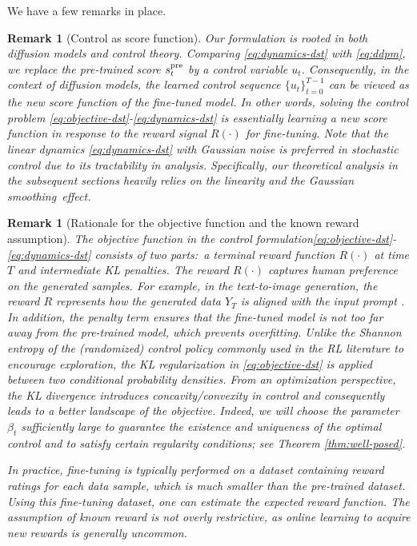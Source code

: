 \documentclass{article}
\newtheorem{Remark}[Theorem]{Remark}
\begin{document}
{We have a few remarks in place.}    
\begin{Remark}[Control as score function]
    Our formulation is rooted in both diffusion models and control theory. Comparing \eqref{eq:dynamics-dst} with \eqref{eq:ddpm}, we replace the pre-trained score $s_t^{\rm pre}$ by a control variable $u_t$. Consequently, in the context of diffusion models, the learned control sequence $\{u_t\}_{t=0}^{T-1}$ can be viewed as the {\it new} score function of the fine-tuned model. In other words, solving the control problem \eqref{eq:objective-dst}-\eqref{eq:dynamics-dst} is essentially learning a new score function in response to the reward signal $R(\cdot)$ for fine-tuning. Note that the linear dynamics \eqref{eq:dynamics-dst} with Gaussian noise is preferred in stochastic control due to its tractability in analysis. Specifically, our theoretical analysis in the subsequent sections heavily relies on the linearity and the Gaussian smoothing~effect.
\end{Remark} 

\begin{Remark}[Rationale for the objective function and the known reward assumption]
     The objective function in the control formulation\eqref{eq:objective-dst}-\eqref{eq:dynamics-dst}  consists of two parts:~a terminal reward function $R(\cdot)$ at time $T$ and intermediate KL penalties. The reward $R(\cdot)$ captures human preference on the generated samples. For example, in the text-to-image generation, the reward $R$ represents how the generated data $Y_T$ is aligned with the input prompt \cite{fan2024reinforcement,black2023training}. In addition, the penalty term ensures that the fine-tuned model is not too far away from the pre-trained model, which prevents overfitting. Unlike the Shannon entropy of the (randomized) control policy commonly used in the RL literature to encourage exploration, the KL regularization in \eqref{eq:objective-dst}  is applied between two conditional probability densities. From an optimization perspective, the KL divergence introduces   concavity/convexity in control and consequently leads to a better landscape of the objective. Indeed, we will choose the parameter $\beta_t$ sufficiently large to guarantee the existence and uniqueness of the optimal control and to satisfy certain regularity conditions; see Theorem \ref{thm:well-posed}.

    In practice, fine-tuning is typically performed on a dataset containing reward ratings for each data sample, which is much smaller than the pre-trained dataset. Using this fine-tuning dataset, one can estimate the expected reward function. The assumption of known reward is not overly restrictive, as online learning to acquire new rewards is generally uncommon.
\end{Remark}    
    
\end{document}
